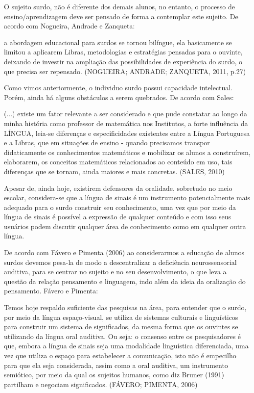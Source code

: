 \documentclass[brasil]{abnt}
\begin{document}
	O sujeito surdo, não é diferente dos demais alunos, no entanto, o processo de ensino/aprendizagem deve ser pensado de forma a contemplar este sujeito. De acordo com Nogueira, Andrade e Zanqueta:

		\begin{citacao}[...] a abordagem educacional para surdos se tornou bilíngue, ela basicamente se limitou a aplicarem Libras, metodologias e estratégias pensadas para o ouvinte, deixando de investir 
						na ampliação das possibilidades de experiência do surdo, o que precisa ser repensado. (NOGUEIRA; ANDRADE; ZANQUETA, 2011, p.27)
		\end{citacao}
	
	Como vimos anteriormente, o individuo surdo possui capacidade intelectual. Porém, ainda há alguns obstáculos a serem quebrados. De acordo com Sales:
			
			\begin{citacao} (...) existe um fator relevante a ser considerado e que pude constatar ao longo da minha história como professor de matemática nos Institutos, a forte influência da LÍNGUA, 
							leia-se diferenças e especificidades existentes entre a Língua Portuguesa e a Libras, que em situações de ensino - quando precisamos transpor didaticamente os conhecimentos 
							matemáticos e mobilizar os alunos a construírem, elaborarem, os conceitos matemáticos relacionados ao conteúdo em uso, tais diferenças que se tornam, ainda maiores e mais 
							concretas. (SALES, 2010) 
			\end{citacao}
	
	Apesar de, ainda hoje, existirem defensores da oralidade, sobretudo no meio escolar, considera-se que a língua de sinais é um instrumento potencialmente mais adequado para o surdo construir seu 
	conhecimento, uma vez que por meio da língua de sinais é possível a expressão de qualquer conteúdo e com isso seus usuários podem discutir qualquer área de conhecimento como em qualquer outra 
	língua.  	 
	
	De acordo com Fávero e Pimenta (2006) ao considerarmos a educação de alunos surdos devemos pesa-la de modo a descentralizar a deficiência neurossensorial auditiva, para se centrar no sujeito
	e no seu desenvolvimento, o que leva a questão da relação pensamento e linguagem, indo além da ideia da oralização do pensamento. Fávero e Pimenta:
	
			\begin{citacao}Temos hoje respaldo suficiente das pesquisas na área, para entender que o surdo, por meio da língua espaço-visual, se utiliza de sistemas culturais e linguísticos para construir 
							um sistema de significados, da mesma forma que os ouvintes se utilizando da língua oral auditiva. Ou seja: o consenso entre os pesquisadores é que, embora a língua de sinais seja 
							uma modalidade linguística diferenciada, uma vez que utiliza o espaço para estabelecer a comunicação, isto não é empecilho para que ela seja considerada, assim como a oral auditiva, 
							um instrumento semiótico, por meio da qual os sujeitos humanos, como diz Bruner (1991) partilham e negociam significados. (FÁVERO; PIMENTA, 2006) 
			\end{citacao}
	
\end{document}
